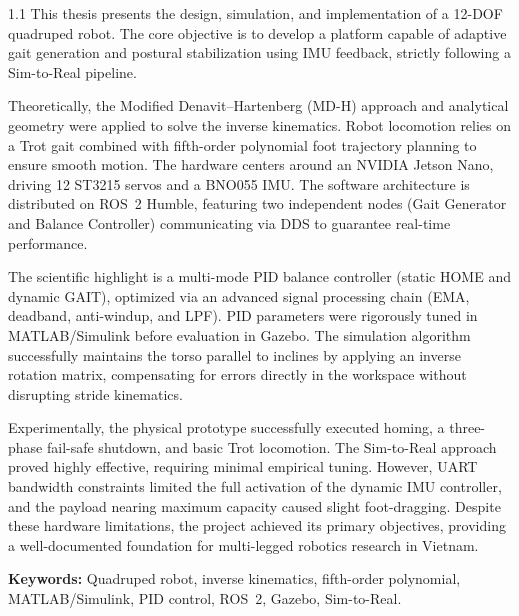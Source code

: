\documentclass[12pt,a4paper,oneside]{extbook}
\begin{document}
\begin{spacing}{1.1}
This thesis presents the design, simulation, and implementation of a 12-DOF quadruped robot. The core objective is to develop a platform capable of adaptive gait generation and postural stabilization using IMU feedback, strictly following a Sim-to-Real pipeline.

Theoretically, the Modified Denavit--Hartenberg (MD-H) approach and analytical geometry were applied to solve the inverse kinematics. Robot locomotion relies on a Trot gait combined with fifth-order polynomial foot trajectory planning to ensure smooth motion. The hardware centers around an NVIDIA Jetson Nano, driving 12 ST3215 servos and a BNO055 IMU. The software architecture is distributed on ROS~2 Humble, featuring two independent nodes (Gait Generator and Balance Controller) communicating via DDS to guarantee real-time performance.

The scientific highlight is a multi-mode PID balance controller (static HOME and dynamic GAIT), optimized via an advanced signal processing chain (EMA, deadband, anti-windup, and LPF). PID parameters were rigorously tuned in MATLAB/Simulink before evaluation in Gazebo. The simulation algorithm successfully maintains the torso parallel to inclines by applying an inverse rotation matrix, compensating for errors directly in the workspace without disrupting stride kinematics.

Experimentally, the physical prototype successfully executed homing, a three-phase fail-safe shutdown, and basic Trot locomotion. The Sim-to-Real approach proved highly effective, requiring minimal empirical tuning. However, UART bandwidth constraints limited the full activation of the dynamic IMU controller, and the payload nearing maximum capacity caused slight foot-dragging. Despite these hardware limitations, the project achieved its primary objectives, providing a well-documented foundation for multi-legged robotics research in Vietnam.

\vspace{0.5cm}
\noindent\textbf{Keywords:} Quadruped robot, inverse kinematics, fifth-order polynomial, MATLAB/Simulink, PID control, ROS~2, Gazebo, Sim-to-Real.
\end{spacing}


\tableofcontents
\listoftables
\listoffigures


\mainmatter

\pagestyle{fancy}
\fancyhf{} %
\renewcommand{\headrulewidth}{0pt} %
\renewcommand{\footrulewidth}{0pt} %
\fancyfoot[C]{\thepage} %
%







\renewcommand{\bibname}{TÀI LIỆU THAM KHẢO}




\end{document}
